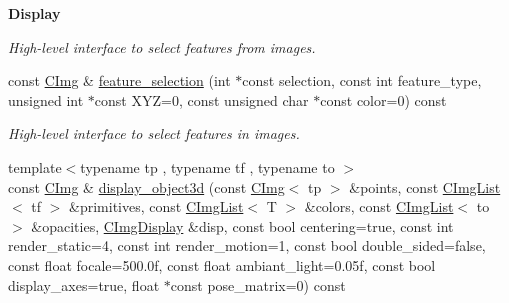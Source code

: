 \begin{Indent}{\bf Display}
\begin{DoxyCompactItemize}
\begin{DoxyCompactList}\small\item\em High-\/level interface to select features from images. \item\end{DoxyCompactList}\item 
\hypertarget{structcimg__library_1_1_c_img_a9264217943de5bce061f9edc982d82a5}{
const \hyperlink{structcimg__library_1_1_c_img}{CImg} \& \hyperlink{structcimg__library_1_1_c_img_a9264217943de5bce061f9edc982d82a5}{feature\_\-selection} (int $\ast$const selection, const int feature\_\-type, unsigned int $\ast$const XYZ=0, const unsigned char $\ast$const color=0) const }
\label{structcimg__library_1_1_c_img_a9264217943de5bce061f9edc982d82a5}

\begin{DoxyCompactList}\small\item\em High-\/level interface to select features in images. \item\end{DoxyCompactList}\item 
\hypertarget{structcimg__library_1_1_c_img_a1da967a40886fcb186e55ee4011ec7e9}{
{\footnotesize template$<$typename tp , typename tf , typename to $>$ }\\const \hyperlink{structcimg__library_1_1_c_img}{CImg} \& \hyperlink{structcimg__library_1_1_c_img_a1da967a40886fcb186e55ee4011ec7e9}{display\_\-object3d} (const \hyperlink{structcimg__library_1_1_c_img}{CImg}$<$ tp $>$ \&points, const \hyperlink{structcimg__library_1_1_c_img_list}{CImgList}$<$ tf $>$ \&primitives, const \hyperlink{structcimg__library_1_1_c_img_list}{CImgList}$<$ T $>$ \&colors, const \hyperlink{structcimg__library_1_1_c_img_list}{CImgList}$<$ to $>$ \&opacities, \hyperlink{structcimg__library_1_1_c_img_display}{CImgDisplay} \&disp, const bool centering=true, const int render\_\-static=4, const int render\_\-motion=1, const bool double\_\-sided=false, const float focale=500.0f, const float ambiant\_\-light=0.05f, const bool display\_\-axes=true, float $\ast$const pose\_\-matrix=0) const }
\label{structcimg__library_1_1_c_img_a1da967a40886fcb186e55ee4011ec7e9}


\end{DoxyCompactItemize}
\end{Indent}
